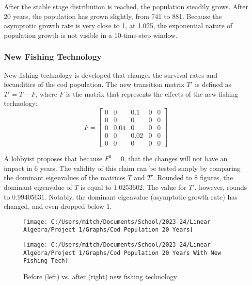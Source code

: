\documentclass{article}
\begin{document}
    After the stable stage distribution is reached, the population steadily grows.
    After 20 years, the population has grown slightly, from 741 to 881.
    Because the asymptotic growth rate is very close to 1, at 1.025, the exponential nature of population growth is not visible in a 10-time-step window.

    \subsubsection{New Fishing Technology}\label{subsubsec:proposed-changes}

    \hspace{\parindent}New fishing technology is developed that changes the survival rates and fecundities of the cod population.
    The new transition matrix $T'$ is defined as $T'=T - F$, where $F$ is the matrix that represents the effects of the new fishing technology:
    \begin{equation}
        F =
        \begin{bmatrix}
            0    & 0   & 0.1 & 0   & 0   \\
            0    & 0   & 0   & 0   & 0   \\
            0    & 0.04& 0   & 0   & 0   \\
            0    & 0   & 0.02& 0   & 0   \\
            0    & 0   & 0   & 0   & 0
        \end{bmatrix}\label{eq:equation15}
    \end{equation}

    A lobbyist proposes that because $F^3=0$, that the changes will not have an impact in 6 years.
    The validity of this claim can be tested simply by comparing the dominant eigenvalues of the matrices $T$ and $T'$.
    Rounded to 8 figures, the dominant eigenvalue of $T$ is equal to $1.0253602$.
    The value for $T'$, however, rounds to $0.99405631$.
    Notably, the dominant eigenvalue (asymptotic growth rate) has changed, and even dropped below 1.
    \begin{figure} [!h]
        \begin{minipage}{0.5\linewidth}
            \centering
            \texttt{[image: C:/Users/mitch/Documents/School/2023-24/Linear Algebra/Project 1/Graphs/Cod Population 20 Years]}
        \end{minipage}\hfill
        \begin{minipage}{0.5\linewidth}
            \centering
            \texttt{[image: C:/Users/mitch/Documents/School/2023-24/Linear Algebra/Project 1/Graphs/Cod Population 20 Years With New Fishing Tech]}
        \end{minipage}
        \caption{Before (left) vs. after (right) new fishing technology}
        \label{fig:b_v_a_fish_tech}
    \end{figure}
\end{document}
